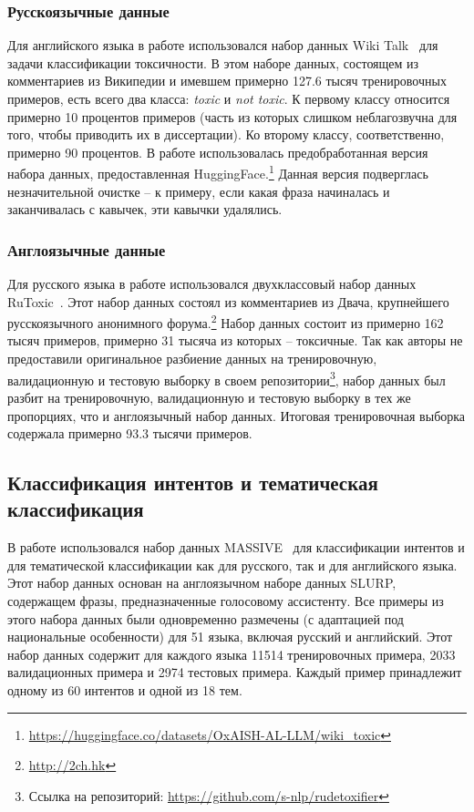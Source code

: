 \subsubsection{Русскоязычные данные}
Для английского языка в работе использовался набор данных {Wiki Talk}~\cite{toxic} для задачи классификации токсичности. В этом наборе данных, состоящем из комментариев из Википедии и имевшем примерно 127.6 тысяч тренировочных примеров, есть всего два класса: \textit{toxic} и \textit{not toxic}. К первому классу относится примерно 10 процентов примеров (часть из которых слишком неблагозвучна для того, чтобы приводить их в диссертации). Ко второму классу, соответственно, примерно 90 процентов.  В работе использовалась предобработанная версия набора данных, предоставленная HuggingFace.\footnote{\url{https://huggingface.co/datasets/OxAISH-AL-LLM/wiki_toxic}} Данная версия подверглась незначительной очистке -- к примеру, если какая фраза начиналась и заканчивалась с кавычек, эти кавычки удалялись.
\subsubsection{Англоязычные данные}
Для русского языка в работе использовался двухклассовый набор данных {RuToxic}~\cite{ru_toxic}. Этот набор данных состоял из комментариев из Двача, крупнейшего русскоязычного анонимного форума.\footnote{\url{http://2ch.hk}} Набор данных состоит из примерно 162 тысяч примеров, примерно 31 тысяча из которых -- токсичные. Так как авторы не предоставили оригинальное разбиение данных на тренировочную, валидационную и тестовую выборку в своем репозитории\footnote{Ссылка на репозиторий: \url{https://github.com/s-nlp/rudetoxifier}}, набор данных был разбит на тренировочную, валидационную и тестовую выборку в тех же пропорциях, что и англоязычный набор данных. Итоговая тренировочная выборка содержала примерно 93.3 тысячи примеров.

\subsection{Классификация интентов и тематическая классификация }
В работе использовался набор данных {MASSIVE}~\cite{massive} для классификации интентов и для тематической классификации как для русского, так и для английского языка. Этот набор данных основан на англоязычном наборе данных SLURP\cite{slurp}, содержащем фразы, предназначенные голосовому ассистенту.
 Все примеры из этого набора данных были одновременно размечены (с адаптацией под национальные особенности) для 51 языка, включая русский и английский. Этот набор данных содержит для каждого языка 11514 тренировочных примера, 2033 валидационных примера и 2974 тестовых примера. Каждый пример принадлежит одному из 60 интентов и одной из 18 тем. 

